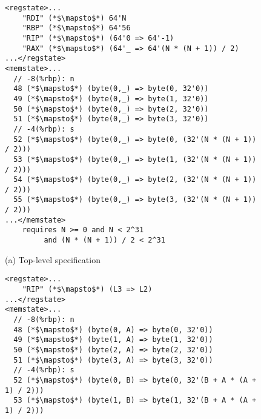 

\begin{figure}[ht]
\begin{lstlisting}[style=KRULE]
<regstate>... 
    "RDI" (*$\mapsto$*) 64'N
    "RBP" (*$\mapsto$*) 64'56
    "RIP" (*$\mapsto$*) (64'0 => 64'-1) 
    "RAX" (*$\mapsto$*) (64'_ => 64'(N * (N + 1)) / 2)
...</regstate>
<memstate>...
  // -8(%rbp): n
  48 (*$\mapsto$*) (byte(0,_) => byte(0, 32'0))
  49 (*$\mapsto$*) (byte(0,_) => byte(1, 32'0))
  50 (*$\mapsto$*) (byte(0,_) => byte(2, 32'0))
  51 (*$\mapsto$*) (byte(0,_) => byte(3, 32'0))
  // -4(%rbp): s
  52 (*$\mapsto$*) (byte(0,_) => byte(0, (32'(N * (N + 1)) / 2)))
  53 (*$\mapsto$*) (byte(0,_) => byte(1, (32'(N * (N + 1)) / 2)))
  54 (*$\mapsto$*) (byte(0,_) => byte(2, (32'(N * (N + 1)) / 2)))
  55 (*$\mapsto$*) (byte(0,_) => byte(3, (32'(N * (N + 1)) / 2)))
...</memstate>
    requires N >= 0 and N < 2^31
         and (N * (N + 1)) / 2 < 2^31
\end{lstlisting}
\begin{center}
\vspace{-5pt}
{\small (a) Top-level specification
}
\vspace{-5pt}
\end{center}
\begin{lstlisting}[style=KRULE]
<regstate>... 
    "RIP" (*$\mapsto$*) (L3 => L2)
...</regstate>
<memstate>...
  // -8(%rbp): n
  48 (*$\mapsto$*) (byte(0, A) => byte(0, 32'0))
  49 (*$\mapsto$*) (byte(1, A) => byte(1, 32'0))
  50 (*$\mapsto$*) (byte(2, A) => byte(2, 32'0))
  51 (*$\mapsto$*) (byte(3, A) => byte(3, 32'0))
  // -4(%rbp): s
  52 (*$\mapsto$*) (byte(0, B) => byte(0, 32'(B + A * (A + 1) / 2)))
  53 (*$\mapsto$*) (byte(1, B) => byte(1, 32'(B + A * (A + 1) / 2)))

\end{lstlisting}
\end{figure}
